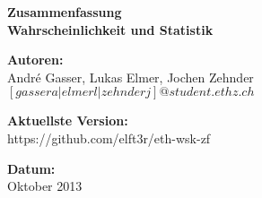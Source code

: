 \begin{center}
	\textbf{Zusammenfassung\\ Wahrscheinlichkeit und Statistik}

	\vspace{10pt}

	\textbf{Autoren:} \\
	André Gasser, Lukas Elmer, Jochen Zehnder \\
	$\left[gassera|elmerl|zehnderj\right]@student.ethz.ch$

	\vspace{10pt}

	\textbf{Aktuellste Version:} \\
	https://github.com/elft3r/eth-wsk-zf

	\vspace{10pt}

	\textbf{Datum:}\\
	Oktober 2013
\end{center}